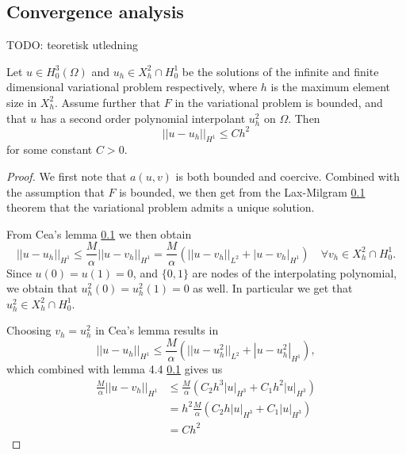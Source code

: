 \subsection{Convergence analysis}


TODO: teoretisk utledning

\begin{theorem}
    Let $u \in H_0^3(\Omega)$ and $u_h \in X_h^2 \cap H_0^1$ be the solutions of the infinite and finite dimensional
    variational problem respectively, where $h$ is the maximum element size in $X_h^2$. Assume further that $F$ in the variational problem is bounded,
    and that $u$ has a second order polynomial interpolant $u_h^2$ on $\Omega$. Then
    \begin{equation}
        ||u - u_h||_{H^1} \leq Ch^2
    \end{equation}
    for some constant $C > 0$.
\end{theorem}
\begin{proof}
    We first note that $a(u, v)$ is both bounded and coercive. Combined with the assumption that $F$ is bounded, we then get from the Lax-Milgram \ref{}
    theorem that the variational problem admits a unique solution.
    
    From Cea's lemma \ref{} we then obtain
    \begin{equation}
        ||u - u_h||_{H^1} \leq \frac{M}{\alpha}||u - v_h||_{H^1} = \frac{M}{\alpha}(||u - v_h||_{L^2} + |u - v_h|_{H^1}) \quad \forall v_h \in X_h^2 \cap H_0^1.
    \end{equation}
    Since $u(0) = u(1) = 0$, and $\{0, 1\}$ are nodes of the interpolating polynomial, we obtain that $u_h^2(0) = u_h^2(1) = 0$ as well.
    In particular we get that $u_h^2 \in X_h^2 \cap H_0^1$.
    
    Choosing $v_h = u_h^2$ in Cea's lemma results in 
    \begin{equation}
        ||u - u_h||_{H^1} \leq \frac{M}{\alpha}(||u - u_h^2||_{L^2} + |u - u_h^2|_{H^1}),
    \end{equation}
    which combined with lemma 4.4 \ref{} gives us
    \begin{equation}
        \begin{aligned}
            \frac{M}{\alpha}||u - v_h||_{H^1} &\leq \frac{M}{\alpha}(C_{2}h^3|u|_{H^3} + C_{1}h^2|u|_{H^3}) \\
            &= h^2\frac{M}{\alpha}(C_{2}h|u|_{H^3} + C_{1}|u|_{H^3}) \\
            &= Ch^2
        \end{aligned}
    \end{equation}
\end{proof}


